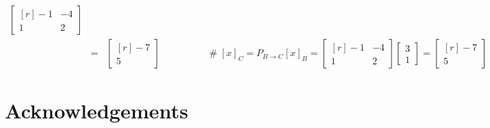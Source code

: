 \documentclass[11pt, oneside]{article}   	%
\begin{document}
\begin{equation*}
\begin{array}{rcll}
         \begin{bmatrix}[r] -1 & -4 \\ 1 & 2 \end{bmatrix}\\
&=&  \begin{bmatrix}[r] -7 \\ 5 \end{bmatrix}
     & \qquad\qquad \mathrel{\#}  [x]_C = P_{B \rightarrow C} [x]_B = \begin{bmatrix}[r] -1 & -4 \\ 1 & 2 \end{bmatrix} \begin{bmatrix} 3 \\1 \end{bmatrix} =  \begin{bmatrix}[r] -7 \\ 5 \end{bmatrix}

\end{array}
\end{equation*}

\section{Acknowledgements}

\newpage


\end{document}

